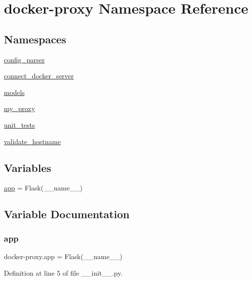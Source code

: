 \hypertarget{namespacedocker-proxy}{}\section{docker-\/proxy Namespace Reference}
\label{namespacedocker-proxy}
\subsection*{Namespaces}
\begin{DoxyCompactItemize}
\item 
 \hyperlink{namespacedocker-proxy_1_1config__parser}{config\+\_\+parser}
\item 
 \hyperlink{namespacedocker-proxy_1_1connect__docker__server}{connect\+\_\+docker\+\_\+server}
\item 
 \hyperlink{namespacedocker-proxy_1_1models}{models}
\item 
 \hyperlink{namespacedocker-proxy_1_1my__proxy}{my\+\_\+proxy}
\item 
 \hyperlink{namespacedocker-proxy_1_1unit__tests}{unit\+\_\+tests}
\item 
 \hyperlink{namespacedocker-proxy_1_1validate__hostname}{validate\+\_\+hostname}
\end{DoxyCompactItemize}
\subsection*{Variables}
\begin{DoxyCompactItemize}
\item 
\hyperlink{namespacedocker-proxy_a77b1cf15d8b7127338d8596c99d67ed7}{app} = Flask(\+\_\+\+\_\+name\+\_\+\+\_\+)
\end{DoxyCompactItemize}


\subsection{Variable Documentation}
\hypertarget{namespacedocker-proxy_a77b1cf15d8b7127338d8596c99d67ed7}{}\label{namespacedocker-proxy_a77b1cf15d8b7127338d8596c99d67ed7} 
\subsubsection{\texorpdfstring{app}{app}}
{\footnotesize\ttfamily docker-\/proxy.\+app = Flask(\+\_\+\+\_\+name\+\_\+\+\_\+)}



Definition at line 5 of file \+\_\+\+\_\+init\+\_\+\+\_\+.\+py.

